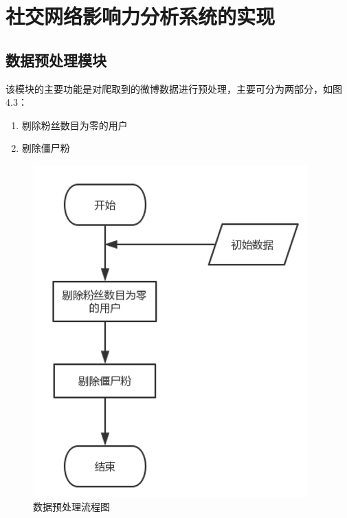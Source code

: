 \section{社交网络影响力分析系统的实现}
\subsection{数据预处理模块}
该模块的主要功能是对爬取到的微博数据进行预处理，主要可分为两部分，如图4.3：
\begin{enumerate}[(1)]
	\item 剔除粉丝数目为零的用户
	\item 剔除僵尸粉
\end{enumerate}
\begin{figure}[h]
	\centering
	\includegraphics[scale=0.5]{figures/5.png}
	\caption{数据预处理流程图}
	\label{fig:1}
\end{figure}

